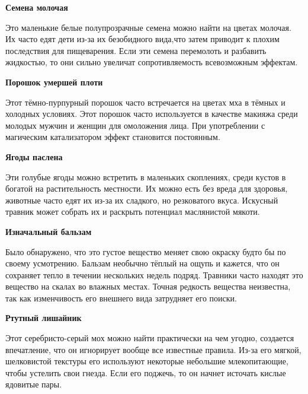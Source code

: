 \documentclass[a4paper, 9pt, twocolumn]{book}
\begin{document}
	\noindent \textbf{Семена молочая}
	
	\smallskip
	
	\noindent Это маленькие белые полупрозрачные семена можно найти на цветах молочая. Их часто едят дети из-за их безобидного вида,что затем приводит к плохим последствия для пищеварения. Если эти семена перемолоть и разбавить жидкостью, то они сильно увеличат сопротивляемость всевозможным эффектам.
	
	\medspace
	
	\noindent \textbf{Порошок умершей плоти} %
	
	\smallskip 
	
	\noindent Этот тёмно-пурпурный порошок часто встречается на цветах мха в тёмных и холодных условиях. Этот порошок часто используется в качестве макияжа среди молодых мужчин и женщин для омоложения лица. При употреблении с магическим катализатором эффект становится постоянным.
	
	\medspace
	
	\noindent \textbf{Ягоды паслена}
	
	\smallskip
	
	\noindent Эти голубые ягоды можно встретить в маленьких скоплениях, среди кустов в богатой на растительность местности. Их можно есть без вреда для здоровья, животные часто едят их из-за их сладкого, но резковатого вкуса. Искусный травник может собрать их и раскрыть потенциал маслянистой мякоти.
	
	\medspace
	
	\noindent \textbf{Изначальный бальзам}
	
	\smallskip
	
	\noindent Было обнаружено, что это густое вещество меняет свою окраску будто бы по своему усмотрению. Бальзам необычно тёплый на ощупь и кажется, что он сохраняет тепло в течении нескольких недель подряд. Травники часто находят это вещество на скалах во влажных местах. Точная редкость вещества неизвестна, так как изменчивость его внешнего вида затрудняет его поиски.
	
	\medspace
	
	\noindent \textbf{Ртутный лишайник}
	
	\smallskip
	
	\noindent Этот серебристо-серый мох можно найти практически на чем угодно, создается впечатление, что он игнорирует вообще все известные правила. Из-за его мягкой, шелковистой текстуры его используют некоторые небольшие млекопитающие, чтобы устелить свои гнезда. Если его поджечь, то он начнет источать кислые ядовитые пары.
	
\end{document}
